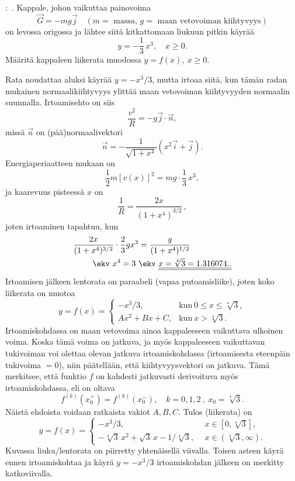 %
\begin{Exa}:\ . Kappale, johon vaikuttaa painovoima
\[
\vec G=-mg\vec j \quad (\text{$m=$ massa, $g=$ maan vetovoiman kiihtyvyys})
\]
on levossa origossa ja lähtee siitä kitkattomaan liukuun pitkin käyrää 
\[
y=-\frac{1}{3}\,x^3,\quad x\geq 0.
\]
Määritä kappaleen liikerata muodossa $y=f(x),\ x\ge0$.
\end{Exa}
\ratk Rata noudattaa aluksi käyrää $y=-x^3/3$, mutta irtoaa siitä, kun tämän radan mukainen 
normaalikiihtyvyys ylittää maan vetovoiman kiihtyvyyden normaalin suunnalla. Irtoamisehto on 
siis
\[
\frac{v^2}{R}=-g\vec j\cdot\vec n,
\]
missä $\vec n$ on (pää)normaalivektori
\[
\vec n=-\frac{1}{\sqrt{1+x^4}}(x^2\vec i + \vec j).
\]
Energiaperiaatteen mukaan on
\[
\frac{1}{2}m[v(x)]^2 = mg\cdot \frac{1}{3}\,x^3,
\]
ja kaarevuus pisteessä $x$ on
\[
\frac{1}{R}=\frac{2x}{(1+x^4)^{3/2}}\,,
\]
joten irtoaminen tapahtuu, kun
\begin{align*}
\frac{2x}{(1+x^4)^{3/2}}\cdot\frac{2}{3}gx^3 &= \frac{g}{(1+x^4)^{1/2}} \\
\ekv \ x^4=3 \ &\ekv \ \underline{\underline{x=\sqrt[4]{3}=1.316074..}}
\end{align*}
Irtoamisen jälkeen lentorata on paraabeli (vapaa putoamisliike), joten koko liikerata on
muotoa
\[
y=f(x)=\begin{cases}
-x^3/3,     &\text{kun}\ 0\leq x\leq\sqrt[4]{3}, \\
Ax^2+Bx+C,  &\text{kun}\ x>\sqrt[4]{3}.
\end{cases}
\]
Irtoamiskohdassa on maan vetovoima ainoa kappaleeseen vaikuttava ulkoinen voima. Koska tämä 
voima on jatkuva, ja myös kappaleeseen vaikuttavan tukivoiman voi olettaa olevan jatkuva 
irtoamiskohdassa (irtoamisesta eteenpäin tukivoima $=0$), niin päätellään, että 
kiihtyvyysvektori on jatkuva. Tämä merkitsee, että funktio $f$ on kahdesti jatkuvasti 
derivoituva myös irtoamiskohdassa, eli on oltava
\[
f^{(k)}(x_0^+)=f^{(k)}(x_0^-),\quad k=0,1,2 \ , \ x_0=\sqrt[4]{3}.
\]
Näistä ehdoista voidaan ratkaista vakiot $A,B,C$. Tulos (liikerata) on
\[
y=f(x)=\begin{cases}
-x^3/3,                                         &x\in [0,\sqrt[4]{3}], \\
-\sqrt[4]{3}\,x^2+\sqrt{3}\,x-1/\sqrt[4]{3},\ \ &x\in (\sqrt[4]{3},\infty).
\end{cases}
\]
Kuvassa liuku/lentorata on piirretty yhtenäisellä viivalla. Toisen asteen käyrä ennen
irtoamiskohtaa ja käyrä $y=-x^3/3$ irtoamiskohdan jälkeen on merkitty katkoviivalla. \loppu
